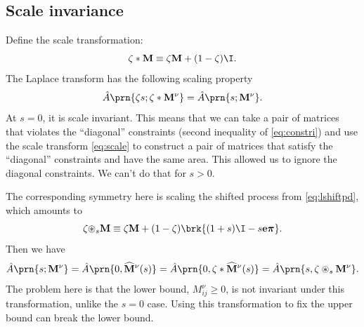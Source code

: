 \documentclass[12pt]{article}
\newcommand{\onev}{\mathbf{e}}
\newcommand{\eqm}{\pi}
\newcommand{\eq}{\boldsymbol{\eqm}}
\newcommand{\MMdm}{M}
\newcommand{\MMd}{\mathbf{\MMdm}}
\newcommand{\shift}[1]{\widehat{#1}}
\begin{document}

\subsection{Scale invariance}\label{sec:scale}

Define the scale transformation:
%
\begin{equation}\label{eq:scale}
  \zeta * \MMd \equiv \zeta \MMd + (1-\zeta)\I .
\end{equation}
%
The Laplace transform has the following scaling property
%
\begin{equation}\label{eq:laplacescale}
  \hat{A} \prn{\zeta s;\zeta * \MMd^\nu} = \hat{A} \prn{s; \MMd^\nu}.
\end{equation}
%
At $s = 0$, it is scale invariant.
This means that we can take a pair of matrices that violates the ``diagonal'' constraints (second inequality of \eqref{eq:constri}) and use the scale transform \eqref{eq:scale} to construct a pair of matrices that satisfy the ``diagonal'' constraints and have the same area.
This allowed us to ignore the diagonal constraints.
We can't do that for $s > 0$.

The corresponding symmetry here is scaling the shifted process from \cref{eq:lshiftpd}, which amounts to
%
\begin{equation}\label{eq:shiftscale}
  \zeta {\circledast}_{s} \MMd 
      \equiv \zeta \MMd
      + (1 - \zeta) \brk{(1 + s)\I - s \onev \eq} .
\end{equation}
%
Then we have
%
\begin{equation}\label{eq:lshiftscale}
  \hat{A} \prn{s; \MMd^\nu} 
    = \hat{A} \prn{0, \shift{\MMd}^\nu(s)}
    = \hat{A} \prn{0, \zeta * \shift{\MMd}^\nu(s)}
    = \hat{A} \prn{s, \zeta \circledast_s \MMd^\nu}.
\end{equation}
%
The problem here is that the lower bound, \(\MMdm^\nu_{ij} \geq 0\), 
is not invariant under this transformation, unlike the \(s = 0\) case.
Using this transformation to fix the upper bound can break the lower bound.
\end{document}
